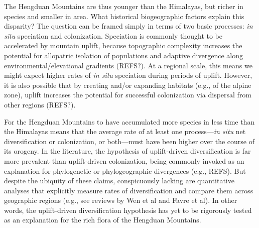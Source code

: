 The Hengduan Mountains are thus younger than the Himalayas, but richer in species and smaller in area. What historical biogeographic factors explain this disparity? The question can be framed simply in terms of two basic processes: \textit{in situ} speciation and colonization. Speciation is commonly thought to be accelerated by mountain uplift, because topographic complexity increases the potential for allopatric isolation of populations and adaptive divergence along environmental/elevational gradients (REFS?). At a regional scale, this means we might expect higher rates of \textit{in situ} speciation during periods of uplift. However, it is also possible that by creating and/or expanding habitats (e.g., of the alpine zone), uplift increases the potential for successful colonization via dispersal from other regions (REFS?).

For the Hengduan Mountains to have accumulated more species in less time than the Himalayas means that the average rate of at least one process---\textit{in situ} net diversification or colonization, or both---must have been higher over the course of its orogeny. In the literature, the hypothesis of uplift-driven diversification is far more prevalent than uplift-driven colonization, being commonly invoked as an explanation for phylogenetic or phylogeographic divergences (e.g., REFS). But despite the ubiquity of these claims, conspicuously lacking are quantitative analyses that explicitly measure rates of diversification and compare them across geographic regions (e.g., see reviews by Wen et al and Favre et al). In other words, the uplift-driven diversification hypothesis has yet to be rigorously tested as an explanation for the rich flora of the Hengduan Mountains.




